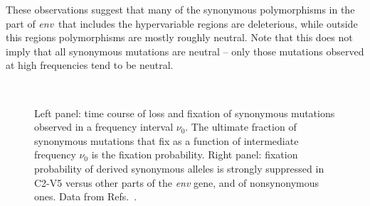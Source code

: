 \documentclass[rmp, twocolumn]{revtex4}
\newcommand{\env}{\textit{env}}
\begin{document}
These observations suggest that many of the synonymous polymorphisms in the part
of \env~that includes the hypervariable regions are deleterious, while outside
this regions polymorphisms are mostly roughly neutral. Note that this does not imply that all 
synonymous mutations are neutral -- only those mutations observed at high frequencies tend 
to be neutral.

\begin{figure}
\begin{center}
\\
\caption{Left panel: time course of loss and fixation of synonymous mutations
 observed in a frequency interval $\nu_0$. The ultimate fraction of synonymous
 mutations that fix as a function of intermediate frequency $\nu_0$ is the
 fixation probability.  Right panel: fixation probability of derived synonymous
alleles is strongly suppressed in C2-V5 versus other parts of the {\it env}
gene, and of nonsynonymous ones. Data from
Refs.~\cite{shankarappa_consistent_1999, bunnik_autologous_2008}.}
\label{fig:fixp}
\end{center}
\end{figure}
\end{document}
